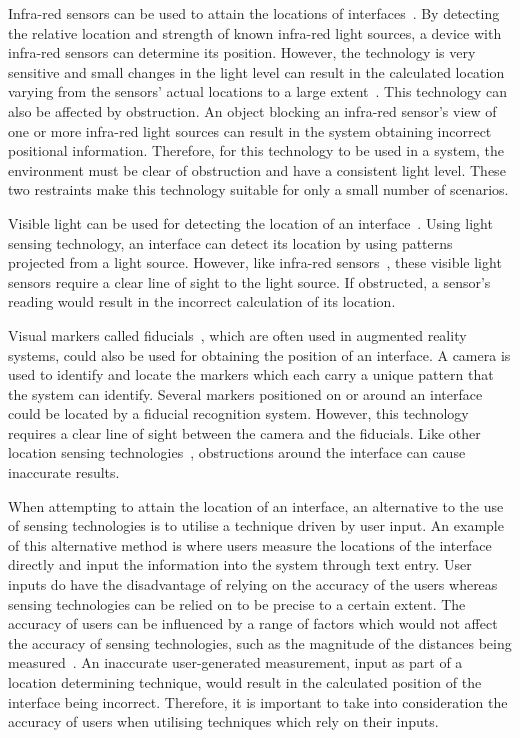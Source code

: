 \documentclass{bmcart}
\begin{document}
Infra-red sensors can be used to attain the locations of interfaces~\cite{Kortuem2005}.
By detecting the relative location and strength of known infra-red light sources, a device with infra-red sensors can determine its position.
However, the technology is very sensitive and small changes in the light level can result in the calculated location varying from the sensors' actual locations to a large extent~\cite{Kortuem2005}.
This technology can also be affected by obstruction.
An object blocking an infra-red sensor's view of one or more infra-red light sources can result in the system obtaining incorrect positional information.
Therefore, for this technology to be used in a system, the environment must be clear of obstruction and have a consistent light level.
These two restraints make this technology suitable for only a small number of scenarios.

Visible light can be used for detecting the location of an interface~\cite{Lee2004}.
Using light sensing technology, an interface can detect its location by using patterns projected from a light source.
However, like infra-red sensors~\cite{Kortuem2005}, these visible light sensors require a clear line of sight to the light source.
If obstructed, a sensor's reading would result in the incorrect calculation of its location.

Visual markers called fiducials~\cite{Bose1990}, which are often used in augmented reality systems, could also be used for obtaining the position of an interface.
A camera is used to identify and locate the markers which each carry a unique pattern that the system can identify.
Several markers positioned on or around an interface could be located by a fiducial recognition system.
However, this technology requires a clear line of sight between the camera and the fiducials.
Like other location sensing technologies~\cite{Lee2004,Kortuem2005,Ni2004}, obstructions around the interface can cause inaccurate results.

When attempting to attain the location of an interface, an alternative to the use of sensing technologies is to utilise a technique driven by user input.
An example of this alternative method is where users measure the locations of the interface directly and input the information into the system through text entry. 
User inputs do have the disadvantage of relying on the accuracy of the users whereas sensing technologies can be relied on to be precise to a certain extent.
The accuracy of users can be influenced by a range of factors which would not affect the accuracy of sensing technologies, such as the magnitude of the distances being measured~\cite{Al-Imam2006}.
An inaccurate user-generated measurement, input as part of a location determining technique, would result in the calculated position of the interface being incorrect.
Therefore, it is important to take into consideration the accuracy of users when utilising techniques which rely on their inputs.
\end{document}
